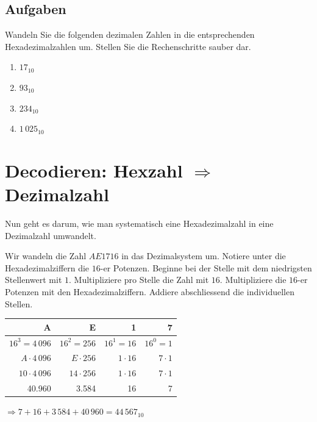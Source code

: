 \subsection{Aufgaben}
\label{subsection-dez2hex-aufgaben}

Wandeln Sie die folgenden dezimalen Zahlen in die entsprechenden Hexadezimalzahlen um. Stellen Sie die Rechenschritte sauber dar.

\begin{enumerate}
\item $17_{10}$
\fillwithgrid{1in}
\item $93_{10}$
\fillwithgrid{2in}
\item $234_{10}$
\fillwithgrid{2.5in}
\item $1\,025_{10}$
\fillwithgrid{2.5in}
\end{enumerate}

\section{Decodieren: Hexzahl $\Rightarrow$ Dezimalzahl}

Nun geht es darum, wie man systematisch eine Hexadezimalzahl in eine Dezimalzahl umwandelt.

\begin{example}
Wir wandeln die Zahl $AE17{16}$ in das Dezimalsystem um. Notiere unter die Hexadezimalziffern die $16$-er Potenzen. Beginne bei der Stelle mit dem niedrigsten Stellenwert mit $1$. Multipliziere pro Stelle die Zahl mit $16$. Multipliziere die $16$-er Potenzen mit den Hexadezimalziffern. Addiere abschliessend die individuellen Stellen.

\begin{table}[htb]
\centering
\begin{tabular}{|r|r|r|r|}
\hline
A  & E  & 1  & 7 \\ \hline
$16^3 = 4\,096$  & $16^2 = 256$  & $16^1 = 16$  & $16^0 = 1$ \\ \hline
$A \cdot 4\,096$ & $E \cdot 256$ & $1 \cdot 16$  & $7 \cdot 1$  \\ \hline
$10 \cdot 4\,096$ & $14 \cdot 256$ & $1 \cdot 16$  & $7 \cdot 1$  \\ \hline\hline
40.960 & 3.584 & 16 & 7 \\ \hline
\end{tabular}
\end{table}

$\Rightarrow 7 + 16 + 3\,584 + 40\,960 = 44\,567_{10}$

\end{example}

